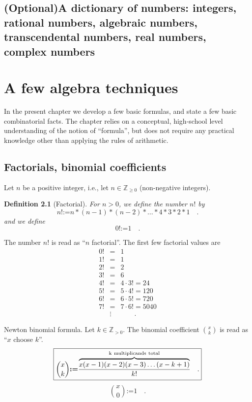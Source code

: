 \documentclass[12pt]{book}
\newcommand{\eqdef}{\textbf{:=}}
\newtheorem{definition}[theorem]{Definition}
\newcommand{\optionalMaterial}{\textbf{(Optional)}}
\begin{document}
\section[\optionalMaterial A dictionary of numbers]{\optionalMaterial A dictionary of numbers: integers, rational numbers, algebraic numbers, transcendental numbers, real numbers, complex numbers}
\chapter{A few algebra techniques}
In the present chapter we develop a few basic formulas, and state a few basic combinatorial facts. The chapter relies on a conceptual, high-school level understanding of the notion of ``formula'', but does not require any practical knowledge other than applying the rules of arithmetic.
\section{Factorials, binomial coefficients}\label{secFactorial}
Let $n$ be a positive integer, i.e., let $n \in \mathbb Z_{\geq 0}$ (non-negative integers).
\begin{definition}[Factorial] 
For $n>0$, we define the number $n!$ by
\[
n!\eqdef n*(n-1)*(n-2)*\dots *4*3*2*1 \quad  .
\]
and we define
\[
0!\eqdef 1\quad .
\]
\end{definition}
The number $n!$ is read as ``$n$ factorial''. The first few factorial values are
\[\begin{array}{rcl}
0!&=&1\\
1!&=&1\\
2!&=&2\\
3!&=&6\\
4!&=&4\cdot 3!=24\\
5!&=&5\cdot 4!=120\\
6!&=&6\cdot 5!=720\\
7!&=&7\cdot 6!=5040  \\
&\vdots&\quad \quad .
\end{array}
\]

 Newton binomial formula.
 Let $k\in \mathbb Z_{>0}$. The binomial coefficient $\binom{x}{k}$ is read as ``$x$ choose $k$''.
\begin{equation}\boxed{
\label{eqBinomialCoeffDefinition}
\binom{x}{k}\eqdef \frac{ \overbrace{ x(x-1)(x-2)(x-3)\dots (x-k+1)}^{\mathrm{k~multiplicands~total}} } {k!} \quad .
}
\end{equation}
\[\binom{x}{0}\eqdef 1 \quad .
\]
\end{document}
